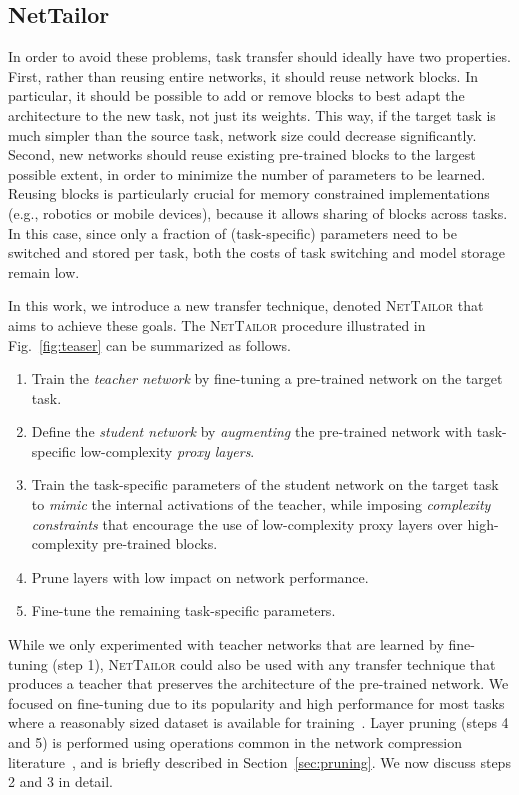 \documentclass[10pt,twocolumn,letterpaper]{article}
\begin{document}
\subsection{NetTailor}
\vspace{-3pt}

In order to avoid these problems, task transfer should ideally have two properties. 
First, rather than reusing entire networks, it should reuse network blocks. In particular, it should be possible to add or remove blocks to best adapt the architecture to the new task, not just its weights. This way, if the target task is much simpler than the source task, network size could decrease significantly. 
Second, new networks should reuse existing pre-trained blocks to the largest possible extent, in order to minimize the number of parameters to be learned. 
Reusing blocks is particularly crucial for memory constrained implementations (e.g., robotics or mobile devices), because it allows sharing of blocks across tasks. In this case, since only a fraction of (task-specific) parameters need to be switched and stored per task, both the costs of task switching and model storage remain low. 

In this work, we introduce a new transfer technique, denoted \textsc{NetTailor} that aims to achieve these goals. The \textsc{NetTailor} procedure illustrated in Fig.~\ref{fig:teaser} can be summarized as follows.
\begin{enumerate}
    \itemsep-1pt
\item Train the {\it teacher network\/} by fine-tuning a pre-trained network on the target task.
    \item Define the {\it student network\/} by {\it augmenting\/} the pre-trained network with task-specific low-complexity {\it proxy layers\/}.
    \item Train the task-specific parameters of the student network on the target task to {\it mimic\/} the internal activations of the teacher, while imposing {\it complexity constraints\/} that encourage the use of low-complexity proxy layers over high-complexity pre-trained blocks.
    \item Prune layers with low impact on network performance.
    \item Fine-tune the remaining task-specific parameters.
\end{enumerate}
While we only experimented with teacher networks that are learned by fine-tuning (step 1), \textsc{NetTailor} could also be used with any transfer technique that produces a teacher that preserves the architecture of the pre-trained network. 
We focused on fine-tuning due to its popularity and high performance for most tasks where a reasonably sized dataset is available for training~\cite{krizhevsky2012imagenet,yosinski2014transferable}.
Layer pruning (steps 4 and 5) is performed using operations common in the network compression literature~\cite{han2015learning,zhou2016less}, and is briefly described in Section~\ref{sec:pruning}.
We now discuss steps 2 and 3 in detail.
\end{document}
